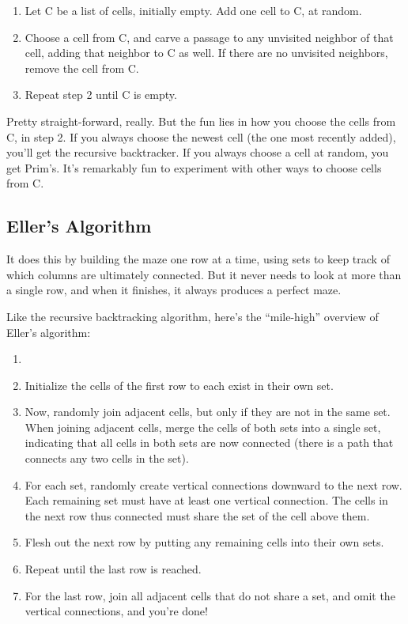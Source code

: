 \documentclass{article}
\begin{document}
\begin{enumerate}
    \item Let C be a list of cells, initially empty. Add one cell to C, at random.
    \item Choose a cell from C, and carve a passage to any unvisited neighbor of that cell, adding that neighbor to C as well. If there are no unvisited neighbors, remove the cell from C.
    \item Repeat step 2 until C is empty.
\end{enumerate}

Pretty straight-forward, really. But the fun lies in how you choose the cells from C, in step 2. If you always choose the newest cell (the one most recently added), you'll get the recursive backtracker. If you always choose a cell at random, you get Prim's. It's remarkably fun to experiment with other ways to choose cells from C.

\subsection{Eller's Algorithm}
It does this by building the maze one row at a time, using sets to keep track of which columns are ultimately connected. But it never needs to look at more than a single row, and when it finishes, it always produces a perfect maze.

Like the recursive backtracking algorithm, here's the “mile-high” overview of Eller's algorithm:
\begin{enumerate}
    \item 
    \item Initialize the cells of the first row to each exist in their own set.
    \item Now, randomly join adjacent cells, but only if they are not in the same set. When joining adjacent cells, merge the cells of both sets into a single set, indicating that all cells in both sets are now connected (there is a path that connects any two cells in the set).
    \item For each set, randomly create vertical connections downward to the next row. Each remaining set must have at least one vertical connection. The cells in the next row thus connected must share the set of the cell above them.
    \item Flesh out the next row by putting any remaining cells into their own sets.
    \item Repeat until the last row is reached.
    \item For the last row, join all adjacent cells that do not share a set, and omit the vertical connections, and you're done!
\end{enumerate}

\printbibliography
\end{document}
